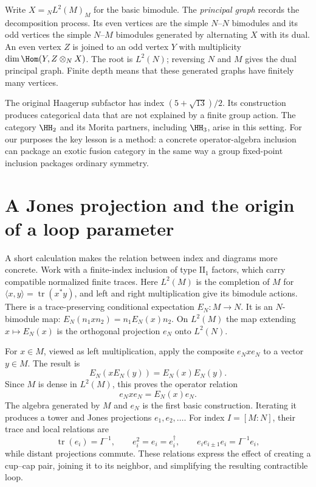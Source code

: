 Write $X={}_N L^2(M)_M$ for the basic bimodule. The
\emph{principal graph} records the decomposition process. Its even
vertices are the simple $N$--$N$ bimodules and its odd vertices the
simple $N$--$M$ bimodules generated by alternating $X$ with its dual.
An even vertex $Z$ is joined to an odd vertex $Y$ with multiplicity
$\dim\Hom(Y,Z\otimes_N X)$. The root is $L^2(N)$; reversing $N$
and $M$ gives the dual principal graph. Finite depth means that these
generated graphs have finitely many vertices.

The original Haagerup subfactor has index
$(5+\sqrt{13})/2$.  Its construction produces categorical data
that are not explained by a finite group action.  The category
$\HH_2$ and its Morita partners, including $\HH_3$, arise in this
setting.  For our purposes the key lesson is a method: a concrete
operator-algebra inclusion can package an exotic fusion category in
the same way a group fixed-point inclusion packages ordinary
symmetry.

\section{A Jones projection and the origin of a loop parameter}

A short calculation makes the relation between index and diagrams
more concrete.  Work with a finite-index inclusion of type
$\mathrm{II}_1$ factors, which carry compatible normalized finite
traces. Here $L^2(M)$ is the completion of $M$ for
$\langle x,y\rangle=\operatorname{tr}(x^*y)$, and left and right
multiplication give its bimodule actions. There is a trace-preserving
conditional expectation $E_N:M\to N$.  It is an $N$-bimodule map:
$E_N(n_1xn_2)=n_1E_N(x)n_2$.  On $L^2(M)$ the map extending
$x\mapsto E_N(x)$ is the orthogonal projection $e_N$ onto
$L^2(N)$.

For $x\in M$, viewed as left multiplication, apply the composite
$e_Nxe_N$ to a vector $y\in M$.  The result is
\[
 E_N(xE_N(y))=E_N(x)E_N(y).
\]
Since $M$ is dense in $L^2(M)$, this proves the operator relation
\begin{equation}
 e_Nxe_N=E_N(x)e_N.
 \label{eq:Jones-compression}
\end{equation}
The algebra generated by $M$ and $e_N$ is the first basic
construction.  Iterating it produces a tower and Jones projections
$e_1,e_2,\ldots$.  For index $I=[M:N]$, their trace and local
relations are
\begin{equation}
 \operatorname{tr}(e_i)=I^{-1},\qquad
 e_i^2=e_i=e_i^\dagger,\qquad
 e_ie_{i\pm1}e_i=I^{-1}e_i,
 \label{eq:Jones-projections}
\end{equation}
while distant projections commute.  These relations express the
effect of creating a cup--cap pair, joining it to its neighbor,
and simplifying the resulting contractible loop.

